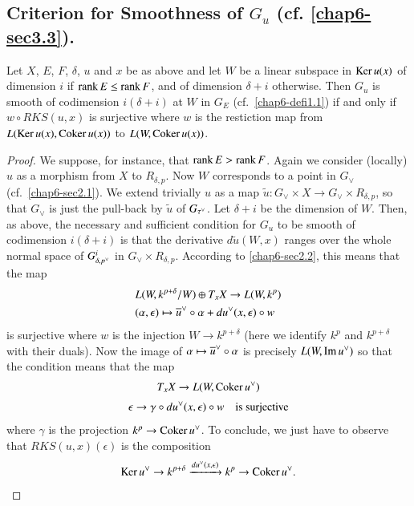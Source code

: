 \subsection{Criterion for Smoothness of \texorpdfstring{$G_{u}$}{Gu}
(cf. \texorpdfstring{\cite{chap6-AC1} \ref{chap6-sec3.3}}{Cite}).}\label{chap6-sec3.5}\pageoriginale

\begin{prop*}
Let $X$, $E$, $F$, $\delta$, $u$ and $x$ be as above and let $W$ be a
linear subspace in $\operatorname{Ker} u(x)$ of dimension $i$ if $\operatorname{rank} E\leq \operatorname{rank}
F$, and of dimension $\delta+i$ otherwise. Then $G_{u}$ is smooth of
codimension $i(\delta+i)$ at $W$ in $G_{E}$ (cf.~\ref{chap6-defi1.1})
if and only if $w\circ RKS(u,x)$ is surjective where $w$ is the
restiction map from $L(\operatorname{Ker} u(x),\operatorname{Coker} u(x))$ to $L(W,\operatorname{Coker} u(x))$.
\end{prop*}

\begin{proof}
We suppose, for instance, that $\operatorname{rank} E>\operatorname{rank} F$. Again we consider
(locally) $u$ as a morphism from $X$ to $R_{\delta,p}$. Now $W$
corresponds to a point in $G_{\vee}$ (cf.~\ref{chap6-sec2.1}). We
extend trivially $u$ as a map $\widetilde{u}:G_{\vee}\times X\to
G_{\vee}\times R_{\delta,p}$, so that $G_{\vee}$ is just the pull-back
by $\widetilde{u}$ of $G_{\tau\spcheck}$. Let $\delta+i$ be the
dimension of $W$. Then, as above, the necessary and sufficient
condition for $G_{u}$ to be smooth of codimension $i(\delta+i)$ is
that the derivative $d\widetilde{u}(W,x)$ ranges over the whole normal
space of $G^{i}_{\delta,p\spcheck}$ in $G_{\vee}\times
R_{\delta,p}$. According to \ref{chap6-sec2.2}, this means that the
map
\begin{align*}
&L(W,k^{p+\delta}/W)\oplus T_{x}X\to L(W,k^{p})\\
&
(\alpha,\epsilon)\mapsto \overline{u}\spcheck \circ \alpha+du\spcheck
(x,\epsilon)\circ w 
\end{align*}
is surjective where $w$ is the injection $W\to k^{p+\delta}$ (here we
identify $k^{p}$ and $k^{p+\delta}$ with their duals). Now the image
of $\alpha\mapsto \overline{u}\spcheck \circ\alpha$ is precisely
$L(W,\text{Im\,}u\spcheck)$ so that the condition means that the map
\begin{gather*}
T_{x}X\to L(W,\Coker u\spcheck)\\[3pt]
\epsilon \to \gamma\circ du\spcheck (x,\epsilon)\circ w\quad\text{is
surjective} 
\end{gather*}
where $\gamma$ is the projection $k^{p}\to \Coker u\spcheck$. To
conclude, we just have to observe that $RKS(u,x)(\epsilon)$ is the
composition 
$$
\Ker u\spcheck \to k^{p+\delta}\xrightarrow{du\spcheck
(x,\epsilon)}k^{p}\to \Coker u\spcheck. 
$$\pageoriginale
\end{proof}

